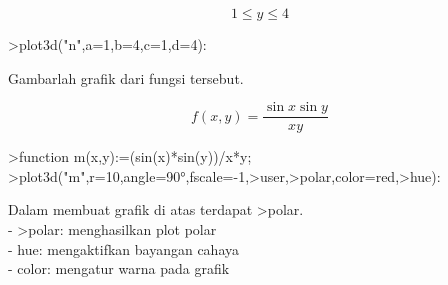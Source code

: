 \documentclass[a4paper,10pt]{article}
\begin{document}
\begin{eulernotebook}
\begin{eulerformula}
\[
1\le y \le4
\]
\end{eulerformula}
\begin{eulerprompt}
>plot3d("n",a=1,b=4,c=1,d=4):
\end{eulerprompt}
\begin{eulercomment}
Gambarlah grafik dari fungsi tersebut.\\
\end{eulercomment}
\begin{eulerformula}
\[
f(x,y)=\frac{\sin{x}\sin{y}}{xy}
\]
\end{eulerformula}
\begin{eulerprompt}
>function m(x,y):=(sin(x)*sin(y))/x*y;
>plot3d("m",r=10,angle=90°,fscale=-1,>user,>polar,color=red,>hue):
\end{eulerprompt}
\begin{eulercomment}
Dalam membuat grafik di atas terdapat \textgreater{}polar.\\
- \textgreater{}polar: menghasilkan plot polar\\
- hue: mengaktifkan bayangan cahaya\\
- color: mengatur warna pada grafik
\end{eulercomment}
\end{eulernotebook}
\end{document}
